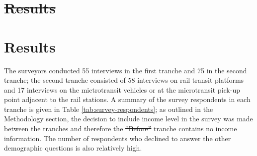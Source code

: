\documentclass[smartcities,article,submit,moreauthors,pdftex]{mdpi} %
\providecommand{\DIFadd}[1]{{\protect\color{blue}\uwave{#1}}} %
\providecommand{\DIFdel}[1]{{\protect\color{red}\sout{#1}}}                      %
\providecommand{\DIFaddbegin}{} %
\providecommand{\DIFaddend}{} %
\providecommand{\DIFdelbegin}{} %
\providecommand{\DIFdelend}{} %
\begin{document}
\DIFdelbegin \section{\DIFdel{Results}}
\addtocounter{section}{-1}%
\DIFdelend \DIFaddbegin \hypertarget{results}{%
\section{Results}\label{results}}
\DIFaddend 

The surveyors conducted 55 interviews in the first tranche and 75 in the second
tranche; the second tranche consisted of 58 interviews on rail transit platforms
and 17 interviews on the mictrotransit vehicles or at the microtransit pick-up
point adjacent to the rail stations. A summary of the survey respondents in each
tranche is given in Table \ref{tab:survey-respondents}; as outlined in the
Methodology section, the decision to include income level in the survey was made
between the tranches and therefore the \DIFdelbegin \DIFdel{“Before” }\DIFdelend \DIFaddbegin \DIFadd{``Before'' }\DIFaddend tranche contains no income
information. The number of respondents who declined to answer the other
demographic questions is also relatively high.
\end{document}

